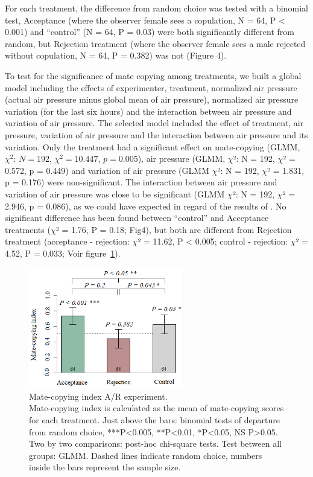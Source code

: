 \documentclass[a4paper, 12pt]{article}
\begin{document}
	For each treatment, the difference from random choice was tested with a binomial test, Acceptance (where the observer female sees a copulation, N = 64, P {\textless} 0.001) and ``control'' (N = 64, P = 0.03) were both significantly different from random, but Rejection treatment (where the observer female sees a male rejected without copulation, N = 64, P = 0.382) was not (Figure 4).

	To test for the significance of mate copying among treatments, we built a global model including the effects of experimenter, treatment, normalized air pressure (actual air pressure minus global mean of air pressure), normalized air pressure variation (for the last six hours) and the interaction between air pressure and variation of air pressure. The selected model included the effect of treatment, air pressure, variation of air pressure and the interaction between air pressure and its variation. Only the treatment had a significant effect on mate-copying (GLMM, $\chi^2$: $N = 192$, $\chi^2 = 10.447$, $p = 0.005$), air pressure (GLMM, $\chi $²: N = 192, $\chi $² = 0.572, p = 0.449) and variation of air pressure (GLMM $\chi $²: N = 192, $\chi $² = 1.831, p = 0.176) were non-significant. The interaction between air pressure and variation of air pressure was close to be significant (GLMM $\chi $²: N = 192, $\chi $² = 2.946, p = 0.086), as we could have expected in regard of the results of \textcite{dagaeff_drosophila_2016}. No significant difference has been found between ``control'' and Acceptance treatments ($\chi $² = 1.76, P = 0.18; Fig4), but both are different from Rejection treatment (acceptance - rejection: $\chi $² = 11.62, P {\textless} 0.005; control - rejection: $\chi $² = 4.52, P = 0.033; Voir figure~\ref{fig:mcsar}).
	

		\begin{figure}
		\centering
		\includegraphics[width=0.6\textwidth]{images/mcsar}
		\caption{Mate-copying index A/R experiment.\\
			 Mate-copying index is calculated as the mean of mate-copying scores for each treatment. Just above the bars: binomial tests of departure from random choice, ***P<0.005, **P<0.01, *P<0.05, NS P>0.05. Two by two comparisons: post-hoc chi-square tests. Test between all groups: GLMM. Dashed lines indicate random choice, numbers inside the bars represent the sample size.}
		\label{fig:mcsar}
	\end{figure}
\end{document}
